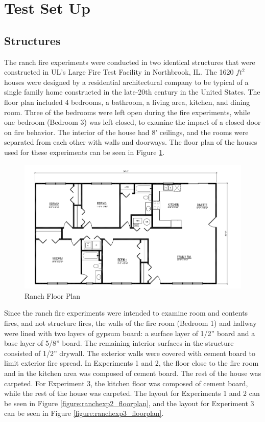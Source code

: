 \documentclass{article}
\begin{document}
\clearpage

\section{Test Set Up}

\subsection{Structures}

The ranch fire experiments were conducted in two identical structures that were constructed in UL's Large Fire Test Facility in Northbrook, IL. The 1620 $ft^2$ houses were designed by a residential  architectural company to be typical of a single family home constructed in the late-20th century in the United States. The floor plan included 4 bedrooms, a bathroom, a living area, kitchen, and dining room. Three of the bedrooms were left open during the fire experiments, while one bedroom (Bedroom 3) was left closed, to examine the impact of a closed door on fire behavior. The interior of the house had 8' ceilings, and the rooms were separated from each other with walls and doorways. The floor plan of the houses used for these experiments can be seen in Figure \ref{figure:ranchexp1_floorplan}.

\begin{figure}[H]
\centering
\includegraphics[width=\textwidth]{0_Images/Ranch_Pictures/Ranch_Floor_Plan.png}
\caption{Ranch Floor Plan}
\label{figure:ranchexp1_floorplan}
\end{figure}


Since the ranch fire experiments were intended to examine room and contents fires, and not structure fires, the walls of the fire room (Bedroom 1) and hallway were lined with two layers of gypsum board: a surface layer of 1/2'' board and a base layer of 5/8'' board. The remaining interior surfaces in the structure consisted of 1/2'' drywall. The exterior walls were covered with cement board to limit exterior fire spread. In Experiments 1 and 2, the floor close to the fire room and in the kitchen area was composed of cement board. The rest of the house was carpeted. For Experiment 3, the kitchen floor was composed of cement board, while the rest of the house was carpeted. The layout for Experiments 1 and 2 can be seen in Figure \ref{figure:ranchexp2_floorplan}, and the layout for Experiment 3 can be seen in Figure \ref{figure:ranchexp3_floorplan}.
\end{document}
